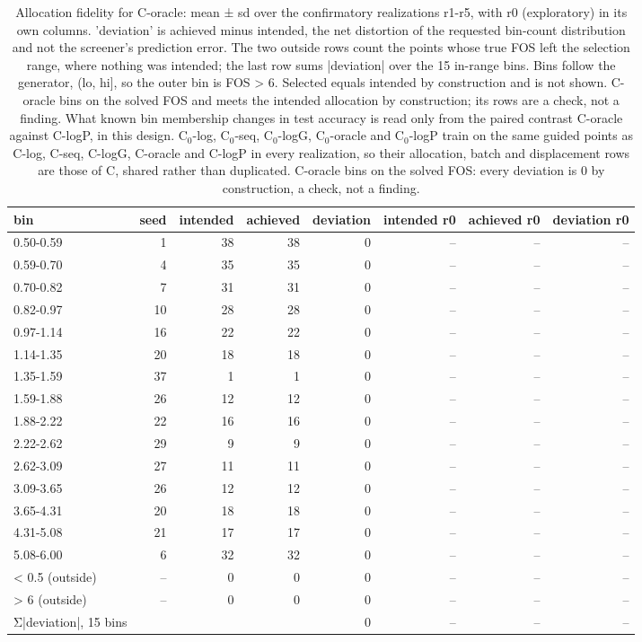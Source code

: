 \begin{table}[htbp]
\centering
\small
\setlength{\tabcolsep}{4pt}
\caption{Allocation fidelity for C-oracle: mean ± sd over the confirmatory realizations r1-r5, with r0 (exploratory) in its own columns. 'deviation' is achieved minus intended, the net distortion of the requested bin-count distribution and not the screener's prediction error. The two outside rows count the points whose true FOS left the selection range, where nothing was intended; the last row sums |deviation| over the 15 in-range bins. Bins follow the generator, (lo, hi], so the outer bin is FOS > 6. Selected equals intended by construction and is not shown. C-oracle bins on the solved FOS and meets the intended allocation by construction; its rows are a check, not a finding. What known bin membership changes in test accuracy is read only from the paired contrast C-oracle against C-logP, in this design. C$_0$-log, C$_0$-seq, C$_0$-logG, C$_0$-oracle and C$_0$-logP train on the same guided points as C-log, C-seq, C-logG, C-oracle and C-logP in every realization, so their allocation, batch and displacement rows are those of C, shared rather than duplicated. C-oracle bins on the solved FOS: every deviation is 0 by construction, a check, not a finding.}
\label{tab:structural:allocation:c-oracle}
\begin{tabular}{lrrrrrrr}
\toprule
bin & seed & intended & achieved & deviation & intended r0 & achieved r0 & deviation r0 \\
\midrule
0.50-0.59 & 1 & 38 & 38 & 0 & -- & -- & -- \\
0.59-0.70 & 4 & 35 & 35 & 0 & -- & -- & -- \\
0.70-0.82 & 7 & 31 & 31 & 0 & -- & -- & -- \\
0.82-0.97 & 10 & 28 & 28 & 0 & -- & -- & -- \\
0.97-1.14 & 16 & 22 & 22 & 0 & -- & -- & -- \\
1.14-1.35 & 20 & 18 & 18 & 0 & -- & -- & -- \\
1.35-1.59 & 37 & 1 & 1 & 0 & -- & -- & -- \\
1.59-1.88 & 26 & 12 & 12 & 0 & -- & -- & -- \\
1.88-2.22 & 22 & 16 & 16 & 0 & -- & -- & -- \\
2.22-2.62 & 29 & 9 & 9 & 0 & -- & -- & -- \\
2.62-3.09 & 27 & 11 & 11 & 0 & -- & -- & -- \\
3.09-3.65 & 26 & 12 & 12 & 0 & -- & -- & -- \\
3.65-4.31 & 20 & 18 & 18 & 0 & -- & -- & -- \\
4.31-5.08 & 21 & 17 & 17 & 0 & -- & -- & -- \\
5.08-6.00 & 6 & 32 & 32 & 0 & -- & -- & -- \\
< 0.5 (outside) & -- & 0 & 0 & 0 & -- & -- & -- \\
> 6 (outside) & -- & 0 & 0 & 0 & -- & -- & -- \\
Σ|deviation|, 15 bins &  &  &  & 0 & -- & -- & -- \\
\bottomrule
\end{tabular}
\end{table}
